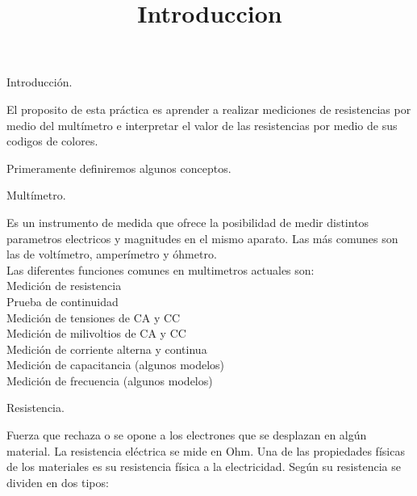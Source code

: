 \documentclass[11pt,a4paper]{report}
\title{Introduccion}
\begin{document}
	\begin{center}
		\begin{huge}
		Introducci\'on.\\
		\vspace*{1.5cm}
		\end{huge}
		\end{center}
	
\begin{flushleft}
	
		El proposito de esta pr\'actica es aprender a realizar mediciones de resistencias por medio del mult\'imetro e interpretar el valor de las resistencias por medio de sus codigos de colores.\\
		\vspace*{0.5cm}
		
		Primeramente definiremos algunos conceptos.\\
		\vspace*{0.5cm}
		\begin{Large}
				Mult\'imetro.\\
		\end{Large}
		Es un instrumento de medida que ofrece la posibilidad de medir distintos parametros electricos y magnitudes en el mismo aparato. Las más comunes son las de voltímetro, amperímetro y óhmetro.\\
		\vspace*{0.5cm}
		Las diferentes funciones comunes en multimetros actuales son:\\
		Medición de resistencia\\
		Prueba de continuidad\\
		Medición de tensiones de CA y CC\\
		Medición de milivoltios de CA y CC\\
		Medición de corriente alterna y continua\\
		Medición de capacitancia (algunos modelos)\\
		Medición de frecuencia (algunos modelos)\\
		\vspace*{0.5cm}
		
		\begin{Large}
			Resistencia.\\
		\end{Large}
	
	 Fuerza que rechaza o se opone a los electrones que se desplazan en algún material. La resistencia eléctrica se mide en Ohm. Una de las propiedades físicas de los materiales es su resistencia física a la electricidad. Según su resistencia se dividen en dos tipos:\\
	 \vspace*{0.5cm}
	 		

\end{flushleft}
\end{document}
